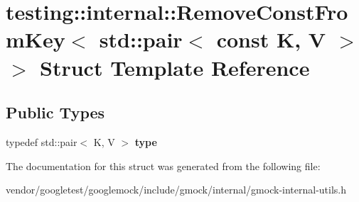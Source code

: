 \hypertarget{structtesting_1_1internal_1_1RemoveConstFromKey_3_01std_1_1pair_3_01const_01K_00_01V_01_4_01_4}{}\section{testing\+:\+:internal\+:\+:Remove\+Const\+From\+Key$<$ std\+:\+:pair$<$ const K, V $>$ $>$ Struct Template Reference}
\label{structtesting_1_1internal_1_1RemoveConstFromKey_3_01std_1_1pair_3_01const_01K_00_01V_01_4_01_4}
\subsection*{Public Types}
\begin{DoxyCompactItemize}
\item 
typedef std\+::pair$<$ K, V $>$ {\bfseries type}\hypertarget{structtesting_1_1internal_1_1RemoveConstFromKey_3_01std_1_1pair_3_01const_01K_00_01V_01_4_01_4_ac1d76274964aa8172889a4714246e86f}{}\label{structtesting_1_1internal_1_1RemoveConstFromKey_3_01std_1_1pair_3_01const_01K_00_01V_01_4_01_4_ac1d76274964aa8172889a4714246e86f}

\end{DoxyCompactItemize}


The documentation for this struct was generated from the following file\+:\begin{DoxyCompactItemize}
\item 
vendor/googletest/googlemock/include/gmock/internal/gmock-\/internal-\/utils.\+h\end{DoxyCompactItemize}
